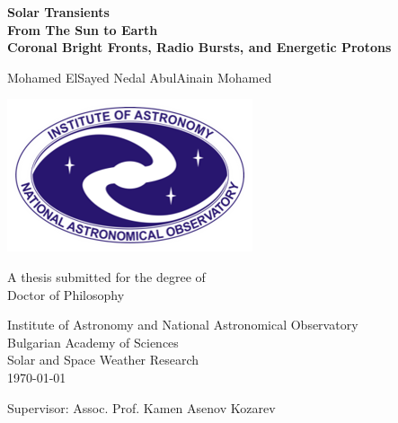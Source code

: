 \begin{titlepage}
    \begin{center}
        \vspace*{1cm}
        
        \Huge
        \textbf{Solar Transients\\From The Sun to Earth\\}
        \huge
        \textbf{Coronal Bright Fronts, Radio Bursts, and Energetic Protons}
        
        \vspace{1.5cm}
        
        \LARGE
        Mohamed ElSayed Nedal AbulAinain Mohamed
        
        \vfill
        \includegraphics[scale=0.7]{extras/ianao_logo.png}
        
        \vfill
        
        A thesis submitted for the degree of\\
        Doctor of Philosophy
        
        \vspace{0.8cm}
        
        \Large
        Institute of Astronomy and National Astronomical Observatory\\Bulgarian Academy of Sciences\\
        Solar and Space Weather Research\\
        \today
        
        \vspace{0.8cm}
        
        Supervisor: Assoc. Prof. Kamen Asenov Kozarev
        
    \end{center}
\end{titlepage}
